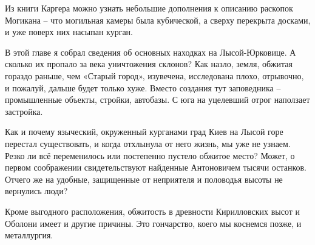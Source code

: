 Из книги Каргера можно узнать небольшие дополнения к описанию раскопок Могикана – что могильная камеры была кубической, а сверху перекрыта досками, и уже поверх них насыпан курган.

В этой главе я собрал сведения об основных находках на Лысой-Юрковице. А сколько их пропало за века уничтожения склонов? Как назло, земля, обжитая гораздо раньше, чем «Старый город», изувечена, исследована плохо, отрывочно, и пожалуй, дальше будет только хуже. Вместо создания тут заповедника – промышленные объекты, стройки, автобазы. С юга на уцелевший отрог наползает застройка.

Как и почему языческий, окруженный курганами град Киев на Лысой горе перестал существовать, и когда отхлынула от него жизнь, мы уже не узнаем. Резко ли всё переменилось или постепенно пустело обжитое место? Может, о первом соображении свидетельствуют найденные Антоновичем тысячи останков. Отчего же на удобные, защищенные от неприятеля и половодья высоты не вернулись люди?

Кроме выгодного расположения, обжитость в древности Кирилловских высот и Оболони имеет и другие причины. Это гончарство, коего мы коснемся позже, и металлургия.
